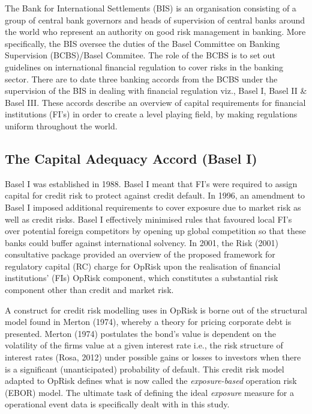 \documentclass{DissertateUSU}
\begin{document}
The Bank for International Settlements (BIS) is an organisation
consisting of a group of central bank governors and heads of supervision
of central banks around the world who represent an authority on good
risk management in banking. More specifically, the BIS oversee the
duties of the Basel Committee on Banking Supervision (BCBS)/Basel
Commitee. The role of the BCBS is to set out guidelines on international
financial regulation to cover risks in the banking sector. There are to
date three banking accords from the BCBS under the supervision of the
BIS in dealing with financial regulation viz., Basel I, Basel II \&
Basel III. These accords describe an overview of capital requirements
for financial institutions (FI's) in order to create a level playing
field, by making regulations uniform throughout the world.

\subsection{The Capital Adequacy Accord (Basel I)}

Basel I was established in 1988. Basel I meant that FI's were required
to assign capital for credit risk to protect against credit default. In
1996, an amendment to Basel I imposed additional requirements to cover
exposure due to market risk as well as credit risks. Basel I effectively
minimised rules that favoured local FI's over potential foreign
competitors by opening up global competition so that these banks could
buffer against international solvency. In 2001, the Risk (2001)
consultative package provided an overview of the proposed framework for
regulatory capital (RC) charge for OpRisk upon the realisation of
financial institutions' (FIs) OpRisk component, which constitutes a
substantial risk component other than credit and market risk. \medskip

A construct for credit risk modelling uses in OpRisk is borne out of the
structural model found in Merton (1974), whereby a theory for pricing
corporate debt is presented. Merton (1974) postulates the bond's value
is dependent on the volatility of the firms value at a given interest
rate i.e., the risk structure of interest rates (Rosa, 2012) under
possible gains or losses to investors when there is a significant
(unanticipated) probability of default. This credit risk model adapted
to OpRisk defines what is now called the \emph{exposure-based} operation
risk (EBOR) model. The ultimate task of defining the ideal
\emph{exposure} measure for a operational event data is specifically
dealt with in this study.\medskip
\end{document}
